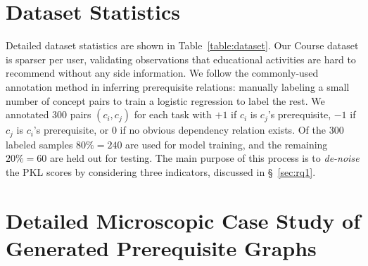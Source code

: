 \clearpage
\section{Dataset Statistics}
\label{appendix:dataset}
\begin{table}[h!]
\setlength{\abovecaptionskip}{-0.2cm}
\setlength{\belowcaptionskip}{-0cm}
{}
\caption{Statistics of the datasets used in our experiments. U--I: user--item interactions; C--C pairs: concept-concept pairs. }
\label{table:dataset}
\end{table}

Detailed dataset statistics are shown in Table~\ref{table:dataset}. Our Course dataset is sparser per user, validating observations that educational activities are hard to recommend without any side information. 
We follow the commonly-used annotation method \cite{liang2017recovering,pan2017prerequisite,gordon2016modeling} in inferring prerequisite relations: manually labeling a small number of concept pairs to train a logistic regression to label the rest. We annotated 300 pairs $(c_i,c_j)$ for each task with $+1$ if $c_i$ is $c_j$'s prerequisite, $-1$ if $c_j$ is $c_i$'s prerequisite, or 0 if no obvious dependency relation exists.  Of the 300 labeled samples $80\%=240$ are used for model training, and the remaining $20\%=60$ are held out for testing. 
The main purpose of this process is to \textit{de-noise} the PKL scores by considering three indicators, discussed in \S~\ref{sec:rq1}.

\section{Detailed Microscopic Case Study of Generated Prerequisite Graphs}
\label{appendix:micro}

